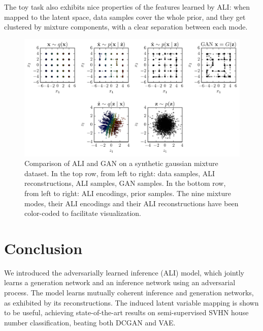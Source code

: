 \documentclass{article}
\begin{document}
The toy task also exhibits nice properties of the features learned by ALI: when
mapped to the latent space, data samples cover the whole prior, and they get
clustered by mixture components, with a clear separation between each mode.

\begin{figure}[t]
    \centering
    \includegraphics[width=\textwidth]{mixture_plot.pdf}
    \caption{\label{fig:mixture} Comparison of ALI and GAN on a synthetic
      gaussian mixture dataset. In the top row, from left to right: data
      samples, ALI reconstructions, ALI samples, GAN samples. In the bottom row,
      from left to right: ALI encodings, prior samples. The nine mixture modes,
      their ALI encodings and their ALI reconstructions have been color-coded
      to facilitate visualization.}
\end{figure}

\section{Conclusion}

We introduced the adversarially learned inference (ALI) model, which jointly
learns a generation network and an inference network using an adversarial
process. The model learns mutually coherent inference and generation networks,
as exhibited by its reconstructions. The induced latent variable mapping is
shown to be useful, achieving state-of-the-art results on semi-supervised SVHN
house number classification, beating both DCGAN and VAE.

\iftoggle{draft}{}{%
\subsubsection*{Acknowledgments}

The authors would like to acknowledge the support of the following agencies for
research funding and computing support: NSERC, Calcul Qu\'{e}bec, Compute
Canada. We would also like to thank the developers of Theano
\citep{bergstra2010theano,bastien2012theano,theano2016theano}, Blocks and Fuel
\citep{van2015blocks}, which were used extensively for the paper. Finally, we
would like to thank Yoshua Bengio, David Warde-Farley, Yaroslav Ganin and
Laurent Dinh for their valuable feedback.
}
\end{document}

